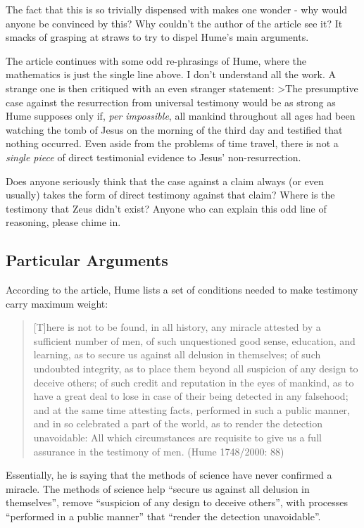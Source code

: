 The fact that this is so trivially dispensed with makes one wonder - why
would anyone be convinced by this? Why couldn't the author of the
article see it? It smacks of grasping at straws to try to dispel Hume's
main arguments.

The article continues with some odd re-phrasings of Hume, where the
mathematics is just the single line above. I don't understand all the
work. A strange one is then critiqued with an even stranger statement:
\textgreater{}The presumptive case against the resurrection from
universal testimony would be as strong as Hume supposes only if,
\emph{per impossible}, all mankind throughout all ages had been watching
the tomb of Jesus on the morning of the third day and testified that
nothing occurred. Even aside from the problems of time travel, there is
not a \emph{single piece} of direct testimonial evidence to Jesus'
non-resurrection.

Does anyone seriously think that the case against a claim always (or
even usually) takes the form of direct testimony against that claim?
Where is the testimony that Zeus didn't exist? Anyone who can explain
this odd line of reasoning, please chime in.

\subsection{Particular Arguments}\label{particular-arguments}

According to the article, Hume lists a set of conditions needed to make
testimony carry maximum weight:

\begin{quote}
{[}T{]}here is not to be found, in all history, any miracle attested by
a sufficient number of men, of such unquestioned good sense, education,
and learning, as to secure us against all delusion in themselves; of
such undoubted integrity, as to place them beyond all suspicion of any
design to deceive others; of such credit and reputation in the eyes of
mankind, as to have a great deal to lose in case of their being detected
in any falsehood; and at the same time attesting facts, performed in
such a public manner, and in so celebrated a part of the world, as to
render the detection unavoidable: All which circumstances are requisite
to give us a full assurance in the testimony of men. (Hume 1748/2000:
88)
\end{quote}

Essentially, he is saying that the methods of science have never
confirmed a miracle. The methods of science help ``secure us against all
delusion in themselves'', remove ``suspicion of any design to deceive
others'', with processes ``performed in a public manner'' that ``render
the detection unavoidable''.

